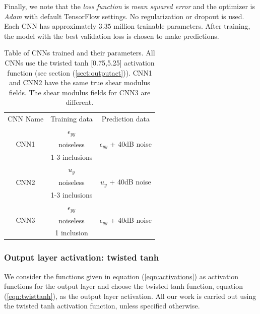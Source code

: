 \documentclass[12pt]{article}
\begin{document}
Finally, we note that the \textit{loss function} is \textit{mean squared error} and the optimizer is \textit{Adam} \cite{misc:kingma2017adam} with default TensorFlow settings. No regularization or dropout is used.  Each CNN has approximately $3.35$ million trainable parameters. After training, the model with the best validation loss is chosen to make predictions.
%
\begin{center}
\begin{table}
  \centering
  \begin{tabular}{|c|c|c|}
    \hline
    \multirow{2}{*}{CNN Name} &  \multirow{2}{*}{Training data}           & \multirow{2}{*}{Prediction data}\\
                              &                                           &  \\
     \hline
     \multirow{3}{*}{CNN1}    &  $\epsilon_{yy}$                           &  \multirow{3}{*}{$\epsilon_{yy}$ + 40dB noise}\\
                              &  noiseless                                & \\
                              &  1-3 inclusions                           &\\
     \hline
     \multirow{3}{*}{CNN2}    &  $u_{y}$                                   & \multirow{3}{*}{$u_{y}$ + 40dB noise}\\
                              &  noiseless                                & \\
                              &  1-3 inclusions                           &\\  
     \hline
     \multirow{3}{*}{CNN3}    &  $\epsilon_{yy}$                           & \multirow{3}{*}{$\epsilon_{yy}$ + 40dB noise}\\
                              &  noiseless                                & \\
                              &  1 inclusion                              & \\

    \hline
  \end{tabular}
  \caption{\label{table:cnnparams} Table of CNNs trained and their parameters. All CNNs use the twisted tanh [0.75,5.25] activation function (see section (\ref{sect:outputact})). CNN1 and CNN2 have the same true shear modulus fields. The shear modulus fields for CNN3 are different.}
\end{table}
\end{center}
%
\subsubsection{\label{sect:outputact} Output layer activation: twisted tanh}
We consider the functions given in equation (\ref{eqn:activations}) as activation functions for the output layer and choose the twisted tanh function, equation (\ref{eqn:twisttanh}), as the output layer activation. All our work is carried out using the twisted tanh activation function, unless specified otherwise.
\end{document}
